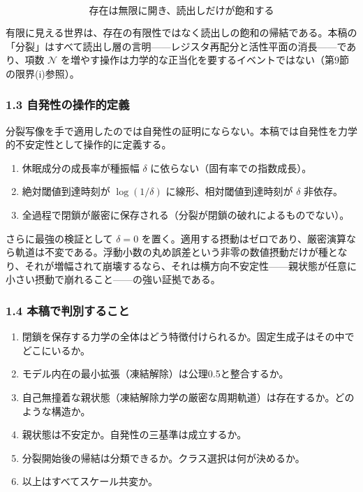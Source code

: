 \documentclass[
  a4paper,
]{ltjsarticle}
\providecommand{\tightlist}{%
  \setlength{\itemsep}{0pt}\setlength{\parskip}{0pt}}
\begin{document}
\[
\boxed{\ \text{存在は無限に開き、読出しだけが飽和する}\ }
\]

有限に見える世界は、存在の有限性ではなく読出しの飽和の帰結である。本稿の「分裂」はすべて読出し層の言明------レジスタ再配分と活性平面の消長------であり、項数
\(\mathcal N\)
を増やす操作は力学的な正当化を要するイベントではない（第9節の限界(i)参照）。

\subsubsection{1.3
自発性の操作的定義}\label{ux81eaux767aux6027ux306eux64cdux4f5cux7684ux5b9aux7fa9}

分裂写像を手で適用したのでは自発性の証明にならない。本稿では自発性を力学的不安定性として操作的に定義する。

\begin{enumerate}
\def\labelenumi{\arabic{enumi}.}
\tightlist
\item
  休眠成分の成長率が種振幅 \(\delta\) に依らない（固有率での指数成長）。
\item
  絶対閾値到達時刻が \(\log(1/\delta)\) に線形、相対閾値到達時刻が
  \(\delta\) 非依存。
\item
  全過程で閉鎖が厳密に保存される（分裂が閉鎖の破れによるものでない）。
\end{enumerate}

さらに最強の検証として \(\delta=0\)
を置く。適用する摂動はゼロであり、厳密演算なら軌道は不変である。浮動小数の丸め誤差という非零の数値摂動だけが種となり、それが増幅されて崩壊するなら、それは横方向不安定性------親状態が任意に小さい摂動で崩れること------の強い証拠である。

\subsubsection{1.4
本稿で判別すること}\label{ux672cux7a3fux3067ux5224ux5225ux3059ux308bux3053ux3068}

\begin{enumerate}
\def\labelenumi{\arabic{enumi}.}
\tightlist
\item
  閉鎖を保存する力学の全体はどう特徴付けられるか。固定生成子はその中でどこにいるか。
\item
  モデル内在の最小拡張（凍結解除）は公理0.5と整合するか。
\item
  自己無撞着な親状態（凍結解除力学の厳密な周期軌道）は存在するか。どのような構造か。
\item
  親状態は不安定か。自発性の三基準は成立するか。
\item
  分裂開始後の帰結は分類できるか。クラス選択は何が決めるか。
\item
  以上はすべてスケール共変か。
\end{enumerate}
\end{document}
